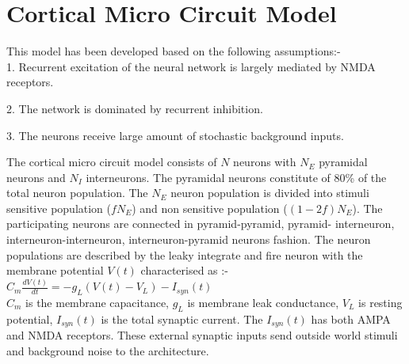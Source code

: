 \section*{Cortical Micro Circuit Model}

This model has been developed based on the following assumptions:-\\
1. Recurrent excitation of the neural network is largely mediated by NMDA receptors.

2. The network is dominated by recurrent inhibition.

3. The neurons receive large amount of stochastic background inputs.

The cortical micro circuit model consists of $N$ neurons with $N_{E}$ pyramidal neurons and $N_{I}$ interneurons. The pyramidal neurons constitute of 80\% of the total neuron population. The $N_{E}$ neuron population is divided into stimuli sensitive population ($fN_{E}$) and non sensitive population ($(1 - 2f)N_{E}$). The participating neurons are connected in pyramid-pyramid, pyramid- interneuron, interneuron-interneuron, interneuron-pyramid neurons fashion. The neuron populations are described by the leaky integrate and fire neuron with the membrane potential $ V(t)$ characterised as :-\\

\indent $C_{m} \frac{dV(t)}{dt} = -g_{L}(V(t) - V_{L}) - I_{syn}(t)$ \\

$C_{m}$ is the membrane capacitance, $g_{L}$ is membrane leak conductance, $V_{L}$ is resting potential, $I_{syn}(t)$ is the total synaptic current.  The $I_{syn} (t)$ has both AMPA and NMDA receptors. These external synaptic inputs send outside world stimuli and background noise to the architecture. 


